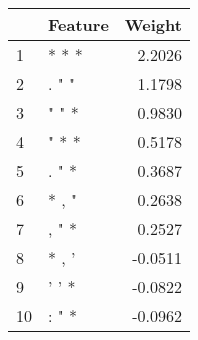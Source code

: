 \begin{tabular}{llr}
\toprule
{} & Feature &  Weight \\
\midrule
1  &   * * * &  2.2026 \\
2  &   . " " &  1.1798 \\
3  &   " " * &  0.9830 \\
4  &   " * * &  0.5178 \\
5  &   . " * &  0.3687 \\
6  &   * , " &  0.2638 \\
7  &   , " * &  0.2527 \\
8  &   * , ' & -0.0511 \\
9  &   ' ' * & -0.0822 \\
10 &   : " * & -0.0962 \\
\bottomrule
\end{tabular}
